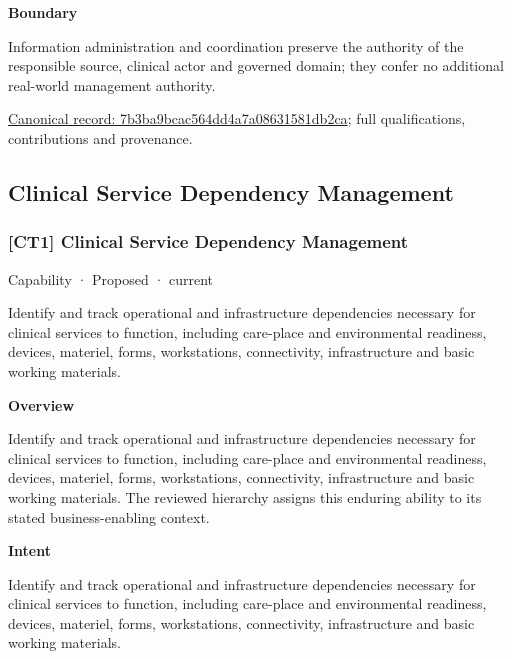 \textbf{Boundary}



Information administration and coordination preserve the authority of the responsible source, clinical actor and governed domain; they confer no additional real-world management authority.


{\footnotesize \href{../../../../continuum/strategy/capability/7b3ba9bcac564dd4a7a08631581db2ca.md}{Canonical record: 7b3ba9bcac564dd4a7a08631581db2ca}; full qualifications, contributions and provenance.}\par
\subsection{Clinical Service Dependency Management}

\subsubsection{[CT1] Clinical Service Dependency Management}

\label{element:232db9b8b47c450cb0aa9acaf539c09d}
{\small Capability · Proposed · current}\par

Identify and track operational and infrastructure dependencies necessary for clinical services to function, including care-place and environmental readiness, devices, materiel, forms, workstations, connectivity, infrastructure and basic working materials.



\textbf{Overview}



Identify and track operational and infrastructure dependencies necessary for clinical services to function, including care-place and environmental readiness, devices, materiel, forms, workstations, connectivity, infrastructure and basic working materials. The reviewed hierarchy assigns this enduring ability to its stated business-enabling context.



\textbf{Intent}



Identify and track operational and infrastructure dependencies necessary for clinical services to function, including care-place and environmental readiness, devices, materiel, forms, workstations, connectivity, infrastructure and basic working materials.



